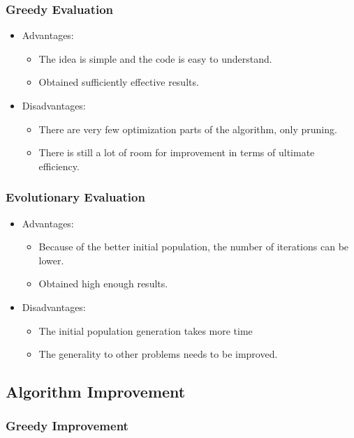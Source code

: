 \documentclass{article}
\begin{document}
\subsubsection{Greedy Evaluation}
\begin{itemize}
    \item Advantages:
    \begin{itemize}
        \item The idea is simple and the code is easy to understand.
        \item Obtained sufficiently effective results.
    \end{itemize}
\item Disadvantages:
    \begin{itemize}
        \item There are very few optimization parts of the algorithm, only pruning.
        \item There is still a lot of room for improvement in terms of ultimate efficiency.
    \end{itemize}
\end{itemize}

\subsubsection{Evolutionary Evaluation}
\begin{itemize}
    \item Advantages:
    \begin{itemize}
        \item Because of the better initial population, the number of iterations can be lower.
        \item Obtained high enough results.
    \end{itemize}
\item Disadvantages:
    \begin{itemize}
        \item The initial population generation takes more time
        \item The generality to other problems needs to be improved.
    \end{itemize}
\end{itemize}


\subsection{Algorithm Improvement}
\subsubsection{Greedy Improvement}
\end{document}
